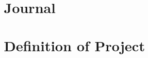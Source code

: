 \chapter{Journal}


\chapter{Definition of Project}
\begin{figure}[H]
\centering
\setlength\fboxsep{0pt}
\setlength\fboxrule{0.5pt}
\end{figure}
